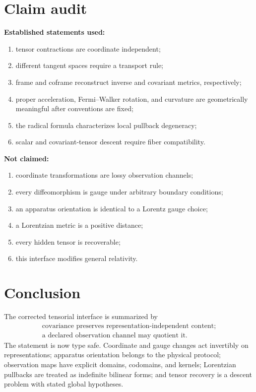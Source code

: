 \documentclass[11pt,a4paper]{article}
\theoremstyle{definition}
\theoremstyle{plain}
\theoremstyle{remark}
\begin{document}
\section{Claim audit}

\textbf{Established statements used:}
\begin{enumerate}[leftmargin=*]
\item tensor contractions are coordinate independent;
\item different tangent spaces require a transport rule;
\item frame and coframe reconstruct inverse and covariant metrics,
respectively;
\item proper acceleration, Fermi--Walker rotation, and curvature are
geometrically meaningful after conventions are fixed;
\item the radical formula characterizes local pullback degeneracy;
\item scalar and covariant-tensor descent require fiber compatibility.
\end{enumerate}

\textbf{Not claimed:}
\begin{enumerate}[leftmargin=*]
\item coordinate transformations are lossy observation channels;
\item every diffeomorphism is gauge under arbitrary boundary conditions;
\item an apparatus orientation is identical to a Lorentz gauge choice;
\item a Lorentzian metric is a positive distance;
\item every hidden tensor is recoverable;
\item this interface modifies general relativity.
\end{enumerate}

\section{Conclusion}

The corrected tensorial interface is summarized by
\[
\boxed{
\begin{gathered}
\text{covariance preserves representation-independent content;}
\\
\text{a declared observation channel may quotient it.}
\end{gathered}
}
\]
The statement is now type safe. Coordinate and gauge changes act
invertibly on representations; apparatus orientation belongs to the
physical protocol; observation maps have explicit domains, codomains, and
kernels; Lorentzian pullbacks are treated as indefinite bilinear forms;
and tensor recovery is a descent problem with stated global hypotheses.
\end{document}
